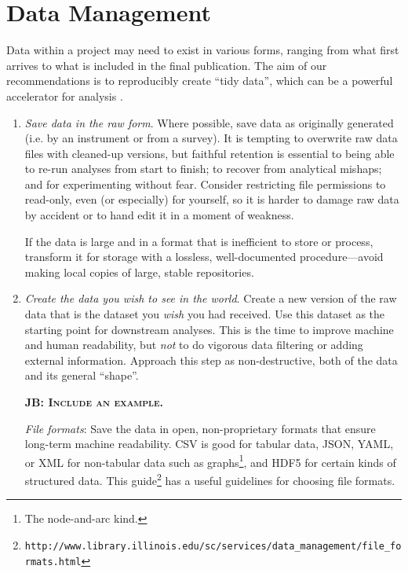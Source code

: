 \documentclass[10pt]{article}
\newcommand{\fixme}[2]{\textsc{\textbf{{#1}: {#2}}}}
\newcommand{\recommend}[1]{\textit{#1}}
\newcommand{\withurl}[2]{{#1}\footnote{\texttt{#2}}}
\begin{document}
\section{Data Management}\label{sec:data}

Data within a project may need to exist in various forms, ranging from what
first arrives to what is included in the final publication.  The aim of
our recommendations is to reproducibly create ``tidy data'', which can be a
powerful accelerator for analysis \cite{wickham2014,hart2015}.

\begin{enumerate}

\item
  \recommend{Save data in the raw form}.  Where possible,
  save data as originally generated (i.e. by an instrument or from a survey).
  It is
  tempting to overwrite raw data files with cleaned-up versions, but
  faithful retention is essential to being able to re-run analyses
  from start to finish; to recover from analytical
  mishaps; and for experimenting without fear. Consider restricting file permissions to read-only,
  even (or especially) for yourself, so it is harder to damage raw
  data by accident or to hand edit it in a moment of weakness.

  If the data is large and in a format that is inefficient to store or process,
  transform it for storage with a lossless, well-documented procedure---avoid
  making local copies of large, stable repositories.

\item
  \recommend{Create the data you wish to see in the world}. Create a new version of the raw data
  that is the dataset you \emph{wish}
  you had received. Use
  this dataset as the starting point for downstream analyses.
  This is the time to improve machine and human readability, but
  \emph{not} to do vigorous data filtering or adding
  external information. Approach this step as non-destructive, both of the data and its general ``shape''.

  \fixme{JB}{Include an example.}

  \emph{File formats}: Save the data in open, non-proprietary
  formats that ensure long-term machine readability.  CSV is good for
  tabular data, JSON, YAML, or XML for non-tabular data such as
  graphs\footnote{The node-and-arc kind.}, and HDF5 for certain kinds
  of structured data.  \withurl{This
    guide}{http://www.library.illinois.edu/sc/services/data\_management/file\_formats.html}
  has a useful guidelines for choosing file formats.


\end{enumerate}
\end{document}
